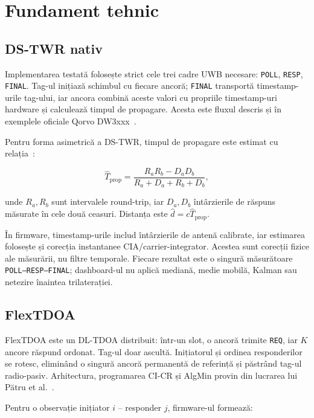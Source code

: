 \documentclass[11pt,a4paper]{article}
\begin{document}
\section{Fundament tehnic}

\subsection{DS-TWR nativ}

Implementarea testată folosește strict cele trei cadre UWB necesare:
\texttt{POLL}, \texttt{RESP}, \texttt{FINAL}. Tag-ul inițiază schimbul cu
fiecare ancoră; \texttt{FINAL} transportă timestamp-urile tag-ului, iar ancora
combină aceste valori cu propriile timestamp-uri hardware și calculează timpul
de propagare. Acesta este fluxul descris și în exemplele oficiale Qorvo
DW3xxx~\cite{qorvo-api}.

Pentru forma asimetrică a DS-TWR, timpul de propagare este estimat cu
relația~\cite{aps013}:

\begin{equation}
  \widehat{T}_{\mathrm{prop}} =
  \frac{R_aR_b-D_aD_b}{R_a+D_a+R_b+D_b},
\end{equation}

unde $R_a,R_b$ sunt intervalele round-trip, iar $D_a,D_b$ întârzierile de
răspuns măsurate în cele două ceasuri. Distanța este
$\widehat d=c\widehat T_{\mathrm{prop}}$.

În firmware, timestamp-urile includ întârzierile de antenă calibrate, iar
estimarea folosește și corecția instantanee CIA/carrier-integrator. Acestea sunt
corecții fizice ale măsurării, nu filtre temporale. Fiecare rezultat este o
singură măsurătoare \texttt{POLL--RESP--FINAL}; dashboard-ul nu aplică mediană,
medie mobilă, Kalman sau netezire înaintea trilaterației.

\subsection{FlexTDOA}

FlexTDOA este un DL-TDOA distribuit: într-un slot, o ancoră trimite
\texttt{REQ}, iar $K$ ancore răspund ordonat. Tag-ul doar ascultă. Inițiatorul
și ordinea responderilor se rotesc, eliminând o singură ancoră permanentă de
referință și păstrând tag-ul radio-pasiv. Arhitectura, programarea CI-CR și
AlgMin provin din lucrarea lui Pătru et al.~\cite{flextdoa-paper}.

Pentru o observație inițiator $i$ -- responder $j$, firmware-ul formează:
\end{document}
